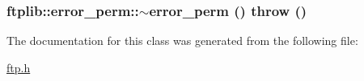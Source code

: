 \hypertarget{classftplib_1_1error__perm_2d105a24ed475f01ed72bf1ce8f53fe8}{
\subsubsection[{$\sim$error\_\-perm}]{\setlength{\rightskip}{0pt plus 5cm}ftplib::error\_\-perm::$\sim$error\_\-perm ()  throw ()}}
\label{classftplib_1_1error__perm_2d105a24ed475f01ed72bf1ce8f53fe8}




The documentation for this class was generated from the following file:\begin{CompactItemize}
\item 
\hyperlink{ftp_8h}{ftp.h}\end{CompactItemize}
